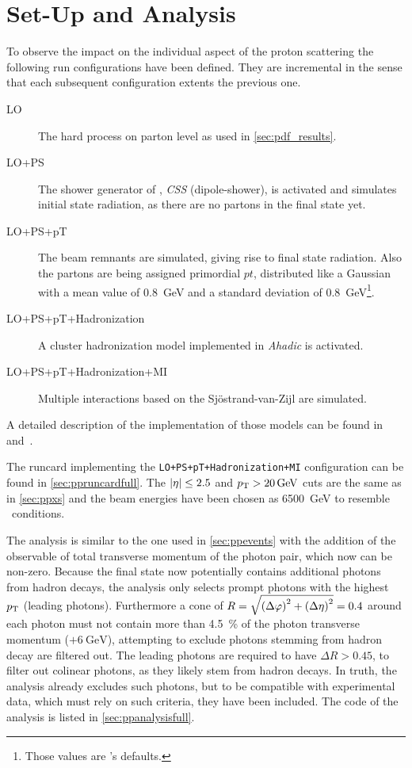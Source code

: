 \section{Set-Up and Analysis}%
\label{sec:setupan}

To observe the impact on the individual aspect of the proton
scattering the following run configurations have been defined. They
are incremental in the sense that each subsequent configuration
extents the previous one.
%
\begin{description}
\item[LO] The hard process on parton level as used in \cref{sec:pdf_results}.
\item[LO+PS] The shower generator of \sherpa, \emph{CSS} (dipole-shower),
  is activated and simulates initial state radiation, as there are no
  partons in the final state yet.
\item[LO+PS+pT] The beam remnants are simulated, giving rise to final state radiation.
  Also the partons are being assigned primordial \(pt\), distributed
  like a Gaussian with a mean value of \SI{.8}{\giga\electronvolt} and
  a standard deviation of \SI{.8}{\giga\electronvolt}\footnote{Those
    values are \sherpa 's defaults.}.
\item[LO+PS+pT+Hadronization] A cluster hadronization model
  implemented in \emph{Ahadic} is activated.
\item[LO+PS+pT+Hadronization+MI] Multiple interactions based on the
  Sj\"ostrand-van-Zijl are simulated.
\end{description}
%
A detailed description of the implementation of those models can be
found in~\cite{Gleisberg:2008ta} and~\cite{Bothmann:2019yzt}.

The runcard implementing the \texttt{LO+PS+pT+Hadronization+MI}
configuration can be found in \cref{sec:ppruncardfull}. The
\(\abs{\eta}\leq 2.5\) and \(p_\mathrm{T} > \SI{20}{\giga\electronvolt}\) cuts are
the same as in \cref{sec:ppxs} and the beam energies have been chosen
as \SI{6500}{\giga\electronvolt} to resemble \lhc\ conditions.

The analysis is similar to the one used in \cref{sec:ppevents} with
the addition of the observable of total transverse momentum of the
photon pair, which now can be non-zero. Because the final state now
potentially contains additional photons from hadron decays, the
analysis only selects prompt photons with the highest \(p_\mathrm{T}\) (leading
photons). Furthermore a cone of
\(R = \sqrt{\qty(\Delta\varphi)^2 + \qty(\Delta\eta)^2} = 0.4\) around
each photon must not contain more than \SI{4.5}{\percent} of the
photon transverse momentum (\(+ \SI{6}{\giga\electronvolt}\)),
attempting to exclude photons stemming from hadron decay are filtered
out. The leading photons are required to have \(\Delta R > 0.45\), to
filter out colinear photons, as they likely stem from hadron
decays. In truth, the analysis already excludes such photons, but to
be compatible with experimental data, which must rely on such
criteria, they have been included. The code of the analysis is listed
in \cref{sec:ppanalysisfull}.


